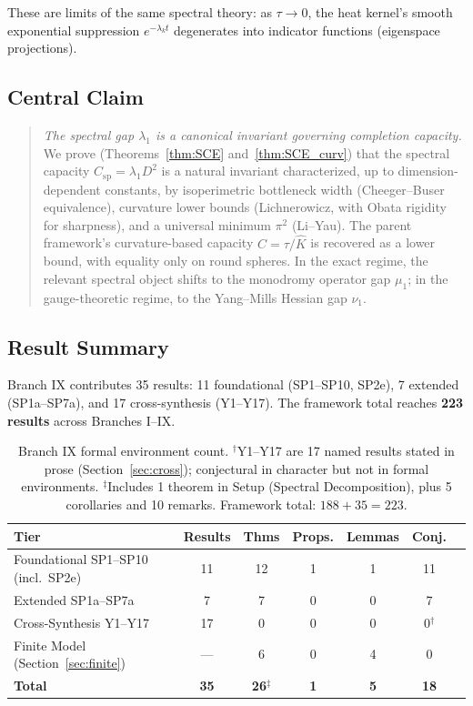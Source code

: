 \documentclass[11pt]{article}
\theoremstyle{definition}
\theoremstyle{remark}
\newcommand{\Csp}{C_{\mathrm{sp}}}
\begin{document}
These are limits of the same spectral theory: as $\tau \to 0$, the heat kernel's smooth exponential suppression $e^{-\lambda_k t}$ degenerates into indicator functions (eigenspace projections).

\subsection{Central Claim}

\begin{quote}
\emph{The spectral gap $\lambda_1$ is a canonical invariant governing completion capacity.} We prove (Theorems~\ref{thm:SCE} and~\ref{thm:SCE_curv}) that the spectral capacity $\Csp = \lambda_1 D^2$ is a natural invariant characterized, up to dimension-dependent constants, by isoperimetric bottleneck width (Cheeger--Buser equivalence), curvature lower bounds (Lichnerowicz, with Obata rigidity for sharpness), and a universal minimum $\pi^2$ (Li--Yau). The parent framework's curvature-based capacity $C = \tau/\hat{K}$ is recovered as a lower bound, with equality only on round spheres. In the exact regime, the relevant spectral object shifts to the monodromy operator gap $\mu_1$; in the gauge-theoretic regime, to the Yang--Mills Hessian gap $\nu_1$.
\end{quote}

\subsection{Result Summary}

Branch IX contributes 35 results: 11 foundational (SP1--SP10, SP2e), 7 extended (SP1a--SP7a), and 17 cross-synthesis (Y1--Y17). The framework total reaches \textbf{223 results} across Branches I--IX.

\begin{table}[h]
\centering
\begin{tabular}{lcccccc}
\toprule
Tier & Results & Thms & Props. & Lemmas & Conj. \\
\midrule
Foundational SP1--SP10 (incl.\ SP2e) & 11 & 12 & 1 & 1 & 11 \\
Extended SP1a--SP7a & 7 & 7 & 0 & 0 & 7 \\
Cross-Synthesis Y1--Y17 & 17 & 0 & 0 & 0 & 0$^\dagger$ \\
Finite Model (Section~\ref{sec:finite}) & --- & 6 & 0 & 4 & 0 \\
\midrule
\textbf{Total} & \textbf{35} & \textbf{26$^\ddagger$} & \textbf{1} & \textbf{5} & \textbf{18} \\
\bottomrule
\end{tabular}
\caption{Branch IX formal environment count. $^\dagger$Y1--Y17 are 17 named results stated in prose (Section~\ref{sec:cross}); conjectural in character but not in formal environments. $^\ddagger$Includes 1 theorem in Setup (Spectral Decomposition), plus 5 corollaries and 10 remarks. Framework total: $188 + 35 = 223$.}
\end{table}
\end{document}
